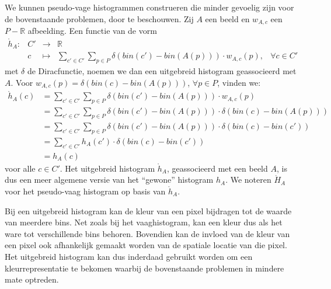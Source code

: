 We kunnen pseudo-vage histogrammen construeren die minder gevoelig zijn voor de bovenstaande problemen,
door  te beschouwen. 
Zij $A$ een beeld en $w_{A,c}$ een $P - \mathbb{R}$ afbeelding. Een functie van de vorm
\begin{displaymath}
\begin{array}{rrcll}
\mathring{h}_A: 
 & C' & \to & \mathbb{R} \\
 & c  & \mapsto & \displaystyle\sum_{c' \in C'} \sum_{p \in P} \delta (bin(c')-bin(A(p))) \cdot w_{A,c}(p), & 
 \forall c \in C'
\end{array}
\end{displaymath}
met $\delta$ de Diracfunctie, noemen we dan een uitgebreid histogram geassocieerd met $A$. 
Voor $w_{A,c}(p)=\delta(bin(c)-bin(A(p)))$, $\forall p \in P$, vinden we:
\begin{align*}
\mathring{h}_A(c) 
 &= \displaystyle \sum_{c' \in C'} \sum_{p \in P} \delta (bin(c')-bin(A(p))) \cdot w_{A,c}(p) \\
 &= \displaystyle \sum_{c' \in C'} \sum_{p \in P} \delta (bin(c')-bin(A(p))) \cdot \delta (bin(c)-bin(A(p))) \\
 &= \displaystyle \sum_{c' \in C'} \sum_{p \in P} \delta (bin(c')-bin(A(p))) \cdot \delta (bin(c)-bin(c')) \\
 &= \displaystyle \sum_{c' \in C'} h_A(c') \cdot \delta (bin(c)-bin(c')) \\
 &= h_A(c)
\end{align*}
voor alle $c \in C'$. Het uitgebreid histogram $\mathring{h}_A$, geassocieerd met een beeld $A$, is 
dus een meer algemene versie van het ``gewone'' histogram $h_A$. We noteren $\mathring{H}_A$ voor het 
pseudo-vaag histogram op basis van $\mathring{h}_A$.

Bij een uitgebreid histogram kan de kleur van een pixel bijdragen tot de waarde van meerdere
bins. Net zoals bij het vaaghistogram, kan een kleur dus als het ware tot verschillende 
bins behoren. Bovendien kan de invloed van de kleur van een pixel ook afhankelijk gemaakt worden
van de spatiale locatie van die pixel. Het uitgebreid histogram kan dus inderdaad gebruikt
worden om een kleurrepresentatie te bekomen waarbij de bovenstaande problemen in mindere mate
optreden.


